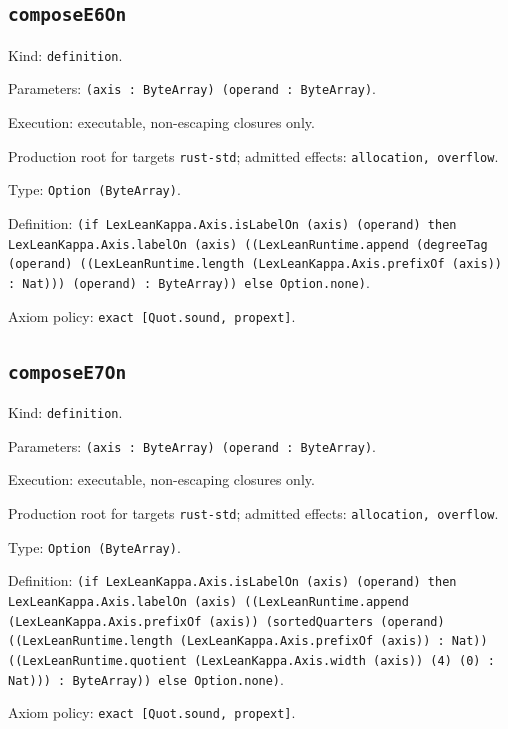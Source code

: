 \documentclass[11pt]{article}
\begin{document}
\subsection*{\texttt{composeE6On}}
\noindent Kind: \texttt{definition}.\par
\noindent Parameters: \texttt{(axis : ByteArray) (operand : ByteArray)}.\par
\noindent Execution: executable, non-escaping closures only.\par
\noindent Production root for targets \texttt{rust-std}; admitted effects: \texttt{allocation, overflow}.\par
\noindent Type: \texttt{Option (ByteArray)}.\par
\noindent Definition: \texttt{(if LexLeanKappa.Axis.isLabelOn (axis) (operand) then LexLeanKappa.Axis.labelOn (axis) ((LexLeanRuntime.append (degreeTag (operand) ((LexLeanRuntime.length (LexLeanKappa.Axis.prefixOf (axis)) : Nat))) (operand) : ByteArray)) else Option.none)}.\par
\noindent Axiom policy: \texttt{exact [Quot.sound, propext]}.\par
\subsection*{\texttt{composeE7On}}
\noindent Kind: \texttt{definition}.\par
\noindent Parameters: \texttt{(axis : ByteArray) (operand : ByteArray)}.\par
\noindent Execution: executable, non-escaping closures only.\par
\noindent Production root for targets \texttt{rust-std}; admitted effects: \texttt{allocation, overflow}.\par
\noindent Type: \texttt{Option (ByteArray)}.\par
\noindent Definition: \texttt{(if LexLeanKappa.Axis.isLabelOn (axis) (operand) then LexLeanKappa.Axis.labelOn (axis) ((LexLeanRuntime.append (LexLeanKappa.Axis.prefixOf (axis)) (sortedQuarters (operand) ((LexLeanRuntime.length (LexLeanKappa.Axis.prefixOf (axis)) : Nat)) ((LexLeanRuntime.quotient (LexLeanKappa.Axis.width (axis)) (4) (0) : Nat))) : ByteArray)) else Option.none)}.\par
\noindent Axiom policy: \texttt{exact [Quot.sound, propext]}.\par
\end{document}
